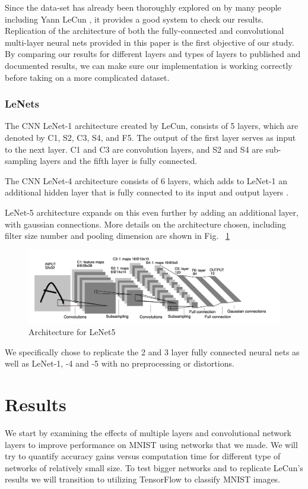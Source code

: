 \documentclass[12pt, twocolumn]{article}
\begin{document}
Since the data-set has already been thoroughly explored on by many people including Yann LeCun \cite{LeCun1998}, it provides a good system to check our results.  Replication of the architecture of both the fully-connected and convolutional multi-layer neural nets provided in this paper is the first objective of our study. By comparing our results for different layers and types of layers to published and documented results, we can make sure our implementation is working correctly before taking on a more complicated dataset. 

\subsubsection{LeNets}
The CNN LeNet-1 architecture created by LeCun, consists of 5 layers, which are denoted by C1, S2, C3, S4, and F5.  The output of the first layer serves as
input to the next layer. C1 and C3 are convolution layers, and S2 and S4 are sub-sampling layers and the fifth layer is fully connected. \cite{LeCun89}

The CNN LeNet-4 architecture consists of 6 layers, which adds to LeNet-1 an additional hidden layer that is fully connected to its  input and output layers . \cite{LeCun95}

LeNet-5 architecture expands on this even further by adding an additional layer, with gaussian connections. More details on the architecture chosen, including filter size number and pooling dimension are shown in Fig. ~\ref{fig:LeNet5}

 \begin{figure}
\includegraphics[scale=.6]{LeNet5.png}
\caption{Architecture for LeNet5 \cite{LeCun1998}}
\label{fig:LeNet5}
\end{figure}


 We specifically chose to replicate the 2 and 3 layer fully connected neural nets as well as LeNet-1, -4 and -5 with no preprocessing or distortions. 


\section{Results}
We start by examining the effects of multiple layers and convolutional network layers to improve performance on MNIST using networks that we made. We will try to quantify accuracy gains versus computation time for different type of networks of relatively small size. To test bigger networks and to replicate LeCun's results we will transition to utilizing TensorFlow to classify MNIST images. 
\end{document}
